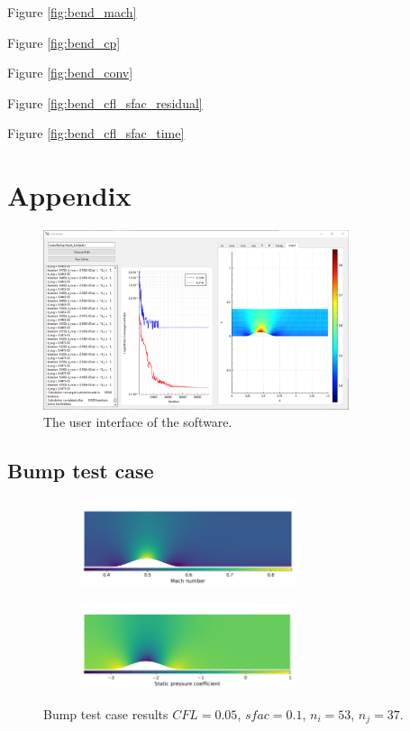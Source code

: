\documentclass{article}
\begin{document}
Figure \ref{fig:bend_mach}

Figure \ref{fig:bend_cp}

Figure \ref{fig:bend_conv}

Figure \ref{fig:bend_cfl_sfac_residual}

Figure \ref{fig:bend_cfl_sfac_time}



\section{Appendix}

\begin{figure}[H]
    \centering
    \includegraphics[width=0.8\textwidth]{figures/software.png}
    \caption{The user interface of the software.}
    \label{fig:ui}
\end{figure}

\subsection{Bump test case}

\begin{figure}[H]
    \centering
    \begin{subfigure}{0.99\textwidth}
        \centering
        \includegraphics[width=0.7\textwidth]{figures/bump_mach.png}
        \caption{}
        \label{fig:bump_mach}
    \end{subfigure}
    \begin{subfigure}{0.99\textwidth}
        \centering
        \includegraphics[width=0.7\textwidth]{figures/bump_cp.png}
        \caption{}
        \label{fig:bump_cp}
    \end{subfigure}
    \caption{Bump test case results $CFL = 0.05$, $sfac = 0.1$, $n_i = 53$, $n_j = 37$.}
\end{figure}
\end{document}
